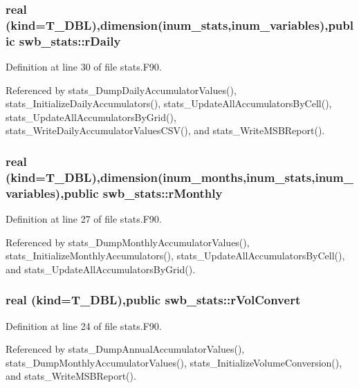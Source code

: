\hypertarget{namespaceswb__stats_a8f4ae0971c0286e171999202b9e5b07f}{
\subsubsection[{rDaily}]{\setlength{\rightskip}{0pt plus 5cm}real (kind=T\_\-DBL),dimension(inum\_\-stats,inum\_\-variables),public {\bf swb\_\-stats::rDaily}}}
\label{namespaceswb__stats_a8f4ae0971c0286e171999202b9e5b07f}


Definition at line 30 of file stats.F90.



Referenced by stats\_\-DumpDailyAccumulatorValues(), stats\_\-InitializeDailyAccumulators(), stats\_\-UpdateAllAccumulatorsByCell(), stats\_\-UpdateAllAccumulatorsByGrid(), stats\_\-WriteDailyAccumulatorValuesCSV(), and stats\_\-WriteMSBReport().

\hypertarget{namespaceswb__stats_a0b1c5339981acd4006223df2a21f1670}{
\subsubsection[{rMonthly}]{\setlength{\rightskip}{0pt plus 5cm}real (kind=T\_\-DBL),dimension(inum\_\-months,inum\_\-stats,inum\_\-variables),public {\bf swb\_\-stats::rMonthly}}}
\label{namespaceswb__stats_a0b1c5339981acd4006223df2a21f1670}


Definition at line 27 of file stats.F90.



Referenced by stats\_\-DumpMonthlyAccumulatorValues(), stats\_\-InitializeMonthlyAccumulators(), stats\_\-UpdateAllAccumulatorsByCell(), and stats\_\-UpdateAllAccumulatorsByGrid().

\hypertarget{namespaceswb__stats_aa4fd347bb81a4fdd52833b87d790de52}{
\subsubsection[{rVolConvert}]{\setlength{\rightskip}{0pt plus 5cm}real (kind=T\_\-DBL),public {\bf swb\_\-stats::rVolConvert}}}
\label{namespaceswb__stats_aa4fd347bb81a4fdd52833b87d790de52}


Definition at line 24 of file stats.F90.



Referenced by stats\_\-DumpAnnualAccumulatorValues(), stats\_\-DumpMonthlyAccumulatorValues(), stats\_\-InitializeVolumeConversion(), and stats\_\-WriteMSBReport().

